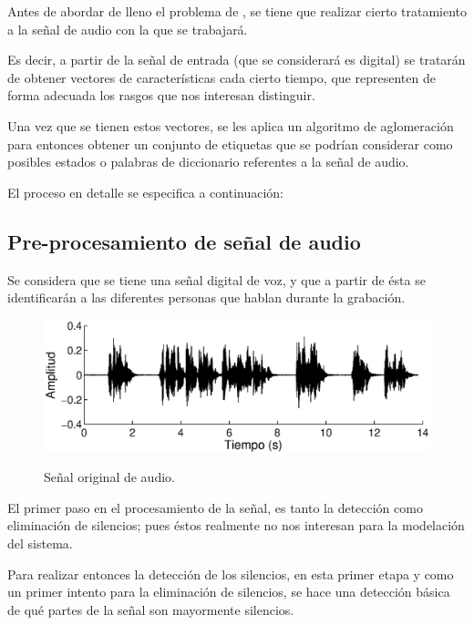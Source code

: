 Antes de abordar de lleno el problema de \sd, se tiene que realizar cierto tratamiento a la señal de audio con la que se trabajará. 

Es decir, a partir de la señal de entrada (que se considerará es digital) se tratarán de obtener vectores de características cada cierto tiempo, que representen de forma adecuada los rasgos que nos interesan distinguir.

Una vez que se tienen estos vectores, se les aplica un algoritmo de aglomeración para entonces obtener un conjunto de etiquetas que se podrían considerar como posibles estados o palabras de diccionario referentes a la señal de audio.

El proceso en detalle se especifica a continuación: 

\subsection{Pre-procesamiento de señal de audio}

Se considera que se tiene una señal digital de voz, y que a partir de ésta se identificarán a las diferentes personas que hablan durante la grabación.

\begin{figure}[ht]
  {\includegraphics[width=0.9\linewidth]{gfx/chap2/signal0}} \quad
  \caption{Señal original de audio.}
  \label{fig:sign_orig}
\end{figure}

El primer paso en el procesamiento de la señal, es tanto la detección como eliminación de silencios; pues éstos realmente no nos interesan para la modelación del sistema.


Para realizar entonces la detección de los silencios, en esta primer etapa y como un primer intento para la eliminación de silencios, se hace una detección básica de qué partes de la señal son mayormente silencios.

